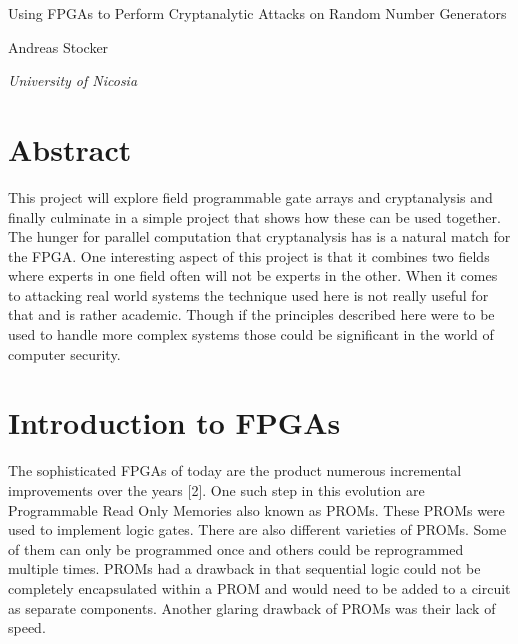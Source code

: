 \documentclass{article}
\begin{document}
    \begin{center}
    \end{center}
    
    \addvspace{20mm}
        
    \begin{center}
        \huge Using FPGAs to Perform Cryptanalytic Attacks on Random Number Generators
    \end{center}
    
    \begin{center}
    \end{center}
       
    \begin{center}
        \large Andreas Stocker
    \end{center}
    
    \begin{center}
        \small \emph {University of Nicosia}
    \end{center}

    \addvspace{15mm}

    \section*{Abstract}

    This project will explore field programmable gate arrays and cryptanalysis and finally
    culminate in a simple project that shows how these can be used together.
    The hunger for parallel computation that cryptanalysis has is a
    natural match for the FPGA. One interesting aspect of this project is
    that it combines two fields where experts in one field often will not
    be experts in the other. When it comes to attacking real world systems the technique
    used here is not really useful for that and is rather academic.
    Though if the principles described here were to be used to handle more complex systems those
    could be significant in the world of computer security.

    \section{Introduction to FPGAs}

    The sophisticated FPGAs of today are the product numerous incremental improvements
    over the years [2]. One such step in this evolution are Programmable Read Only Memories
    also known as PROMs. These PROMs were used to implement logic gates. There are also
    different varieties of PROMs. Some of them can only be programmed once and
    others could be reprogrammed multiple times. PROMs had a drawback in that
    sequential logic could not be completely encapsulated within a PROM and would need
    to be added to a circuit as separate components. Another glaring drawback of PROMs was
    their lack of speed.
\end{document}
